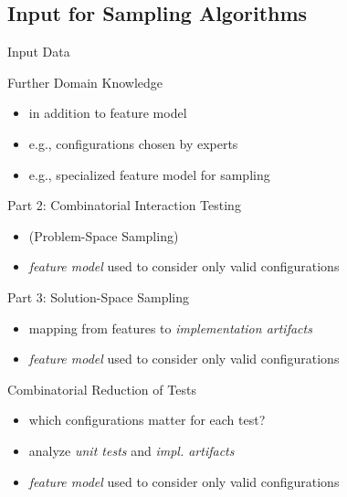 \subsection{Input for Sampling Algorithms}
\begin{frame}{\myframetitle{}}
	\begin{fancycolumns}
		\begin{definition}{Input Data \mysource{\samplingsurvey}}
		\end{definition}
		\pause
		\begin{example}{Further Domain Knowledge \mysource{\samplingsurvey}}
			\begin{itemize}
				\item in addition to feature model
				\item e.g., configurations chosen by experts
				\item e.g., specialized feature model for sampling
			\end{itemize}
		\end{example}
	\nextcolumn
		\pause
		\vspace{-5mm}
		\begin{example}{Part 2: Combinatorial Interaction Testing}
			\begin{itemize}
				\item (Problem-Space Sampling)
				\item \emph{feature model} used to consider only valid configurations
			\end{itemize}
		\end{example}
		\pause
		\begin{example}{Part 3: Solution-Space Sampling}
			\begin{itemize}
				\item mapping from features to \emph{implementation artifacts}
				\item \emph{feature model} used to consider only valid configurations
			\end{itemize}
		\end{example}
		\pause
		\begin{example}{Combinatorial Reduction of Tests \mysource{\reducingconfigurations}}
			\begin{itemize}
				\item which configurations matter for each test?
				\item analyze \emph{unit tests} and \emph{impl. artifacts}
				\item \emph{feature model} used to consider only valid configurations
			\end{itemize}
		\end{example}
	\end{fancycolumns}
\end{frame}
